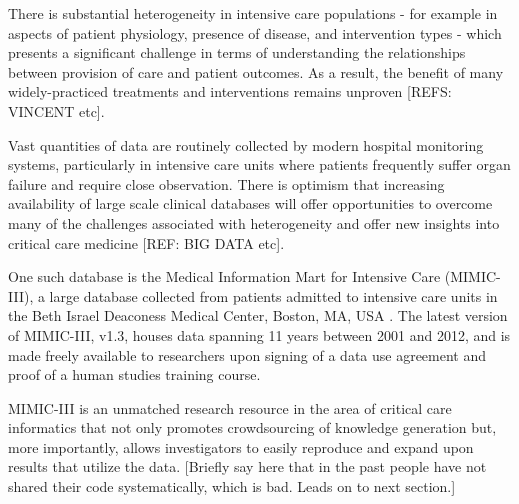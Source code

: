 \documentclass{bioinfo}
\begin{document}


There is substantial heterogeneity in intensive care populations - for example in aspects of patient physiology, presence of disease, and intervention types - which presents a significant challenge in terms of understanding the relationships between provision of care and patient outcomes. As a result, the benefit of many widely-practiced treatments and interventions remains unproven [REFS: VINCENT etc].

Vast quantities of data are routinely collected by modern hospital monitoring systems, particularly in intensive care units where patients frequently suffer organ failure and require close observation. There is optimism that increasing availability of large scale clinical databases will offer opportunities to overcome many of the challenges associated with heterogeneity and offer new insights into critical care medicine [REF: BIG DATA etc]. 


One such database is the Medical Information Mart for Intensive Care (MIMIC-III), a large database collected from patients admitted to intensive care units in the Beth Israel Deaconess Medical Center, Boston, MA, USA \cite{mimiciii}. The latest version of MIMIC-III, v1.3, houses data spanning 11 years between 2001 and 2012, and is made freely available to researchers upon signing of a data use agreement and proof of a human studies training course. 

MIMIC-III is an unmatched research resource in the area of critical care informatics that not only promotes crowdsourcing of knowledge generation but, more importantly, allows investigators to easily reproduce and expand upon results that utilize the data. [Briefly say here that in the past people have not shared their code systematically, which is bad. Leads on to next section.]


\end{document}
